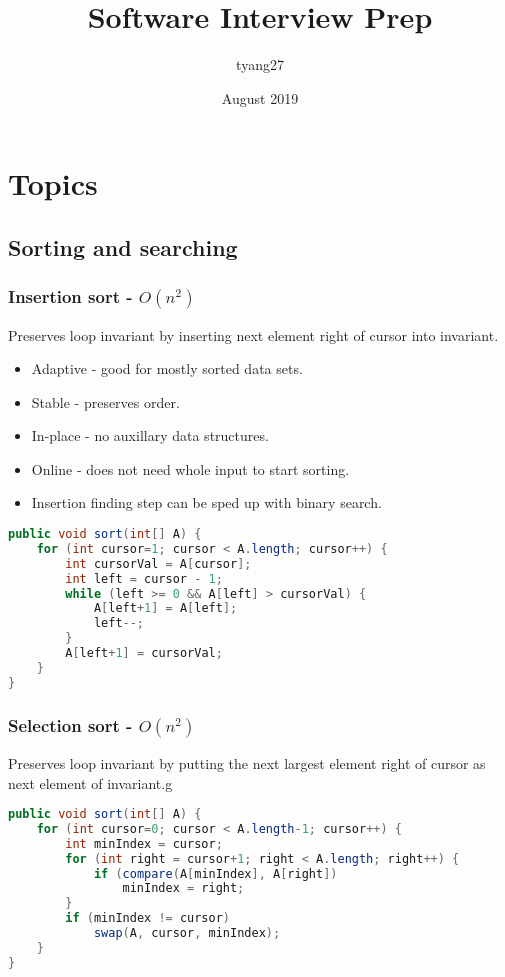 \documentclass{article}
\title{Software Interview Prep}
\author{tyang27}
\date{August 2019}
\begin{document}
\maketitle

\section{Topics}
\subsection{Sorting and searching}
\subsubsection{Insertion sort - $O(n^2)$}
Preserves loop invariant by inserting next element right of cursor into invariant.
\begin{itemize}
    \item Adaptive - good for mostly sorted data sets.
    \item Stable - preserves order.
    \item In-place - no auxillary data structures.
    \item Online - does not need whole input to start sorting.
    \item Insertion finding step can be sped up with binary search.
\end{itemize}
\begin{lstlisting}[language=java]
public void sort(int[] A) {
    for (int cursor=1; cursor < A.length; cursor++) {
        int cursorVal = A[cursor];
        int left = cursor - 1;
        while (left >= 0 && A[left] > cursorVal) {
            A[left+1] = A[left];
            left--;
        }
        A[left+1] = cursorVal;
    }
}
\end{lstlisting}

\subsubsection{Selection sort - $O(n^2)$}
Preserves loop invariant by putting the next largest element right of cursor as next element of invariant.g
\begin{lstlisting}[language=java]
public void sort(int[] A) {
    for (int cursor=0; cursor < A.length-1; cursor++) {
        int minIndex = cursor;
        for (int right = cursor+1; right < A.length; right++) {
            if (compare(A[minIndex], A[right])
                minIndex = right;
        }
        if (minIndex != cursor)
            swap(A, cursor, minIndex);
    }
}
\end{lstlisting}
\end{document}
